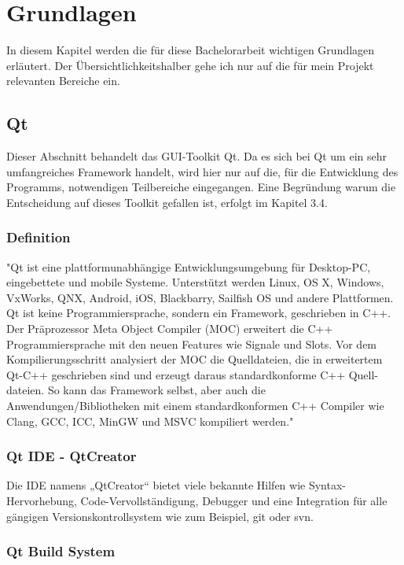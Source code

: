 \chapter{Grundlagen}

In diesem Kapitel werden die für diese Bachelorarbeit wichtigen Grundlagen erläutert. Der Übersichtlichkeitshalber gehe ich nur auf die für mein Projekt relevanten Bereiche ein.	

\section{Qt}
Dieser Abschnitt behandelt das GUI-Toolkit Qt. Da es sich bei Qt um ein sehr umfangreiches Framework handelt, wird hier nur auf die, für die Entwicklung des Programms, notwendigen Teilbereiche eingegangen. Eine Begründung warum die Entscheidung auf dieses Toolkit gefallen ist, erfolgt im Kapitel 3.4.	
	
\subsection{Definition}
"Qt ist eine plattformunabhängige Entwicklungsumgebung für Desktop-PC, eingebettete und mobile Systeme. Unterstützt werden Linux, OS X, Windows,
VxWorks, QNX, Android, iOS, Blackbarry, Sailfish OS und andere Plattformen. Qt ist keine Programmiersprache, sondern ein Framework, geschrieben in
C++. Der Präprozessor Meta Object Compiler (MOC) erweitert die C++ Programmiersprache mit den neuen Features wie Signale und Slots. Vor dem
Kompilierungsschritt analysiert der MOC die Quelldateien, die in erweitertem Qt-C++ geschrieben sind und erzeugt daraus standardkonforme C++ Quell-
dateien. So kann das Framework selbst, aber auch die Anwendungen/Bibliotheken mit einem standardkonformen C++ Compiler wie Clang, GCC, ICC, MinGW
und MSVC kompiliert werden." \cite{QtAbout}
\newpage	
	
\subsection{Qt IDE - QtCreator}

Die \ac{IDE} namens „QtCreator“ bietet viele bekannte Hilfen wie Syntax-Hervorhebung, Code-Vervollständigung, Debugger und eine Integration für alle gängigen Versionskontrollsystem wie zum Beispiel, git oder svn. 	
	
\subsection{Qt Build System}

